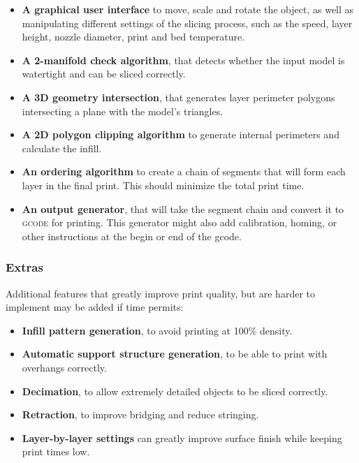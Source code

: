 \begin{itemize}
    \item \textbf{A graphical user interface} to move, scale and rotate the object, as well as manipulating different settings of the slicing process, such as the speed, layer height, nozzle diameter, print and bed temperature.
    \item \textbf{A 2-manifold \cite{wiki:2-manifold} check algorithm}, that detects whether the input model is watertight and can be sliced correctly.
    \item \textbf{A 3D geometry intersection}, that generates layer perimeter polygons intersecting a plane with the model's triangles.
    \item \textbf{A 2D polygon clipping algorithm} to generate internal perimeters and calculate the infill.
    \item \textbf{An ordering algorithm} to create a chain of segments that will form each layer in the final print. This should minimize the total print time.
    \item \textbf{An output  generator}, that will take the segment chain and convert it to \textsc{gcode} for printing. This generator might also add calibration, homing, or other instructions at the begin or end of the gcode.
\end{itemize}

\subsubsection{Extras}

Additional features that greatly improve print quality, but are harder to implement may be added if time permits:

\begin{itemize}
    \item \textbf{Infill pattern generation}, to avoid printing at 100\% density.
    \item \textbf{Automatic support structure generation}, to be able to print with overhangs correctly.
    \item \textbf{Decimation}, to allow extremely detailed objects to be sliced correctly.
    \item \textbf{Retraction}, to improve bridging and reduce stringing.
    \item \textbf{Layer-by-layer settings} can greatly improve surface finish while keeping print times low.
\end{itemize}


